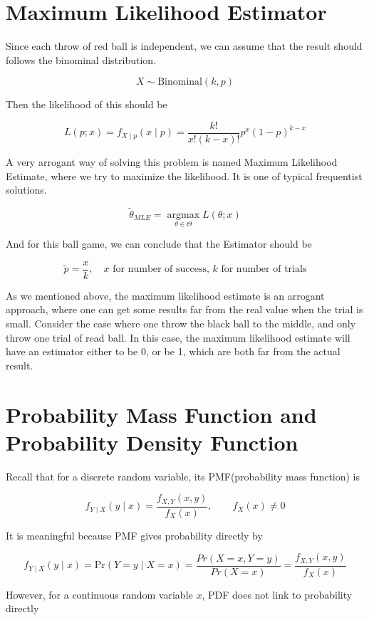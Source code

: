 \documentclass[12pt]{article}
\begin{document}
\begin{flushleft}
\section{Maximum Likelihood Estimator}

\qquad Since each throw of red ball is independent, we can assume that the result should follows the binominal distribution.

$$X \sim \text{Binominal}(k,p)$$

\qquad Then the likelihood of this should be 

$$L(p;x) = f_{X\mid p}(x\mid p) = \frac{k!}{x!(k-x)!}p^{x}(1-p)^{k-x}$$

\qquad A very arrogant way of solving this problem is named Maximum Likelihood Estimate, where we try to maximize the likelihood. It is one of typical frequentist solutions.

$$\tilde{\theta}_{MLE} = \mathop{\text{argmax}}\limits_{\theta \in \Theta} L(\theta; x)$$

\qquad And for this ball game, we can conclude that the Estimator should be 

$$\tilde{p} = \frac{x}{k}, \quad x\text{ for number of success, } k\text{ for number of trials}$$

\qquad As we mentioned above, the maximum likelihood estimate is an arrogant approach, where one can get some results far from the real value when the trial is small. Consider the case where one throw the black ball to the middle, and only throw one trial of read ball. In this case, the maximum likelihood estimate will have an estimator either to be 0, or be 1, which are both far from the actual result.

\section{Probability Mass Function and Probability Density Function}

\qquad Recall that for a discrete random variable, its PMF(probability mass function) is

$$f_{Y\mid X}(y\mid x) = \frac{f_{X,Y}(x, y)}{f_{X}(x)}, \qquad f_{X}(x) \neq 0$$

\qquad It is meaningful because PMF gives probability directly by

$$f_{Y\mid X}(y\mid x) = \text{Pr}(Y = y \mid X = x) = \frac{Pr(X = x, Y = y)}{Pr(X = x)} = \frac{f_{X,Y}(x, y)}{f_{X}(x)}$$

\qquad However, for a continuous random variable $x$, PDF does not link to probability directly


\end{flushleft}
\end{document}
